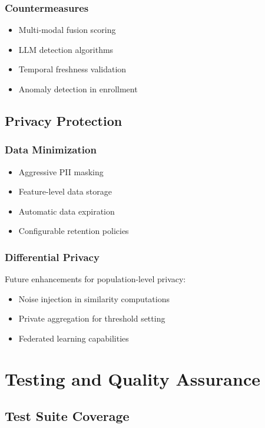 \documentclass[12pt,a4paper]{article}
\begin{document}
\subsubsection{Countermeasures}
\begin{itemize}
    \item Multi-modal fusion scoring
    \item LLM detection algorithms
    \item Temporal freshness validation
    \item Anomaly detection in enrollment
\end{itemize}

\subsection{Privacy Protection}

\subsubsection{Data Minimization}
\begin{itemize}
    \item Aggressive PII masking
    \item Feature-level data storage
    \item Automatic data expiration
    \item Configurable retention policies
\end{itemize}

\subsubsection{Differential Privacy}
Future enhancements for population-level privacy:
\begin{itemize}
    \item Noise injection in similarity computations
    \item Private aggregation for threshold setting
    \item Federated learning capabilities
\end{itemize}

\section{Testing and Quality Assurance}

\subsection{Test Suite Coverage}
\end{document}
